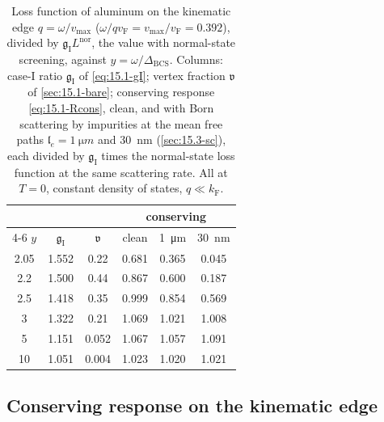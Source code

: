 \begin{table}[tbp]
  \caption{Loss function of aluminum on the kinematic edge $q = \omega/v_{\mathrm{max}}$ ($\omega/qv_{\mathrm{F}} = v_{\mathrm{max}}/v_{\mathrm{F}} = 0.392$), divided by $\mathfrak{g}_{\mathrm{I}}L^{\mathrm{nor}}$, the value with normal-state screening, against $y = \omega/\Delta_{\mathrm{BCS}}$. Columns: case-I ratio $\mathfrak{g}_{\mathrm{I}}$ of \cref{eq:15.1-gI}; vertex fraction $\mathfrak{v}$ of \cref{sec:15.1-bare}; conserving response \cref{eq:15.1-Rcons}, clean, and with Born scattering by impurities at the mean free paths $\mathfrak{l}_e = \SI{1}{\micro m}$ and \SI{30}{nm} (\cref{sec:15.3-sc}), each divided by $\mathfrak{g}_{\mathrm{I}}$ times the normal-state loss function at the same scattering rate. All at $T = 0$, constant density of states, $q \ll k_{\mathrm{F}}$.}
  \label{tab:15-edge}
  \centering\small\setlength{\tabcolsep}{4pt}
  \begin{tabular}{@{}cccccc@{}}
    \toprule
    & & & \multicolumn{3}{c}{conserving} \\
    \cmidrule(l){4-6}
    $y$ & $\mathfrak{g}_{\mathrm{I}}$ & $\mathfrak{v}$ & clean & \SI{1}{\micro m} & \SI{30}{nm} \\
    \midrule
    2.05 & 1.552 & 0.22 & 0.681 & 0.365 & 0.045 \\
    2.2 & 1.500 & 0.44 & 0.867 & 0.600 & 0.187 \\
    2.5 & 1.418 & 0.35 & 0.999 & 0.854 & 0.569 \\
    3 & 1.322 & 0.21 & 1.069 & 1.021 & 1.008 \\
    5 & 1.151 & 0.052 & 1.067 & 1.057 & 1.091 \\
    10 & 1.051 & 0.004 & 1.023 & 1.020 & 1.021 \\
    \bottomrule
  \end{tabular}
\end{table}

\subsection{Conserving response on the kinematic edge}\label{sec:15.2-cons}

